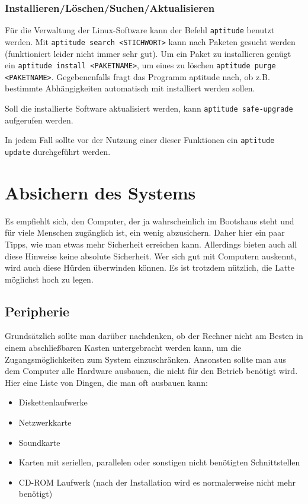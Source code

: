 \documentclass[a4paper,12pt,twoside]{article}
\begin{document}
\subsubsection{Installieren/Löschen/Suchen/Aktualisieren}
\label{sct:software_management}
Für die Verwaltung der
Linux-Software kann der Befehl \texttt{aptitude}
benutzt werden. Mit \texttt{aptitude search
{\textless}STICHWORT{\textgreater}} kann nach Paketen
gesucht werden (funktioniert leider nicht immer sehr gut). Um ein Paket
zu installieren genügt ein \texttt{aptitude install
{\textless}PAKETNAME{\textgreater}}, um eines zu löschen
\texttt{aptitude purge
{\textless}PAKETNAME{\textgreater}}. Gegebenenfalls fragt
das Programm aptitude nach, ob z.B. bestimmte Abhängigkeiten
automatisch mit installiert werden sollen.

Soll die installierte Software aktualisiert werden, kann
\texttt{aptitude safe-upgrade} aufgerufen werden.

In jedem Fall sollte vor der Nutzung einer dieser Funktionen ein
\texttt{aptitude update} durchgeführt werden.


\section{Absichern des Systems}
\label{sct:system_absichern}
Es empfiehlt sich, den Computer, der
ja wahrscheinlich im Bootshaus steht und für viele Menschen
zugänglich ist, ein wenig abzusichern. Daher hier ein paar Tipps, wie
man etwas mehr Sicherheit erreichen kann. Allerdings bieten auch all
diese Hinweise keine absolute Sicherheit. Wer sich gut mit Computern
auskennt, wird auch diese Hürden überwinden können. Es ist trotzdem
nützlich, die Latte möglichst hoch zu legen.


\subsection{Peripherie}
\label{sct:peripherie}
Grundsätzlich sollte man darüber nachdenken, ob der Rechner nicht am
Besten in einem abschließbaren Kasten untergebracht werden kann, um die 
Zugangsmöglichkeiten zum System einzuschränken. Ansonsten sollte man 
aus dem Computer alle Hardware ausbauen, die
nicht für den Betrieb benötigt wird. Hier eine Liste von Dingen, die
man oft ausbauen kann:

\begin{itemize}
    \item Diskettenlaufwerke
    \item Netzwerkkarte
    \item Soundkarte
    \item Karten mit seriellen, parallelen oder sonstigen nicht benötigten
        Schnittstellen
    \item CD-ROM Laufwerk (nach der Installation wird es normalerweise nicht
        mehr benötigt)
\end{itemize}
\end{document}
